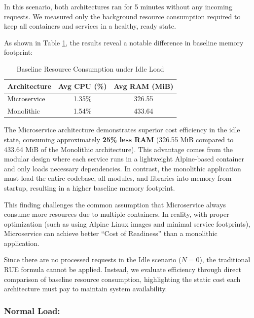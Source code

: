 In this scenario, both architectures ran for 5 minutes without any incoming requests. We measured only the background resource consumption required to keep all containers and services in a healthy, ready state.

As shown in Table \ref{tab:resource_summary_idle}, the results reveal a notable difference in baseline memory footprint:

\begin{table}[h]
\centering
\caption{Baseline Resource Consumption under Idle Load}
\label{tab:resource_summary_idle}
\begin{tabular}{|l|c|c|}
\hline
\textbf{Architecture} & \textbf{Avg CPU (\%)} & \textbf{Avg RAM (MiB)} \\ \hline
Microservice         & 1.35\%                & 326.55                 \\ \hline
Monolithic            & 1.54\%                & 433.64                 \\ \hline
\end{tabular}
\end{table}

The Microservice architecture demonstrates superior cost efficiency in the idle state, consuming approximately \textbf{25\% less RAM} (326.55 MiB compared to 433.64 MiB of the Monolithic architecture). This advantage comes from the modular design where each service runs in a lightweight Alpine-based container and only loads necessary dependencies. In contrast, the monolithic application must load the entire codebase, all modules, and libraries into memory from startup, resulting in a higher baseline memory footprint.

This finding challenges the common assumption that Microservice always consume more resources due to multiple containers. In reality, with proper optimization (such as using Alpine Linux images and minimal service footprints), Microservice can achieve better ``Cost of Readiness'' than a monolithic application.

Since there are no processed requests in the Idle scenario (\(N = 0\)), the traditional RUE formula cannot be applied. Instead, we evaluate efficiency through direct comparison of baseline resource consumption, highlighting the static cost each architecture must pay to maintain system availability.

\subsubsection{\textbf{Normal Load:}}

